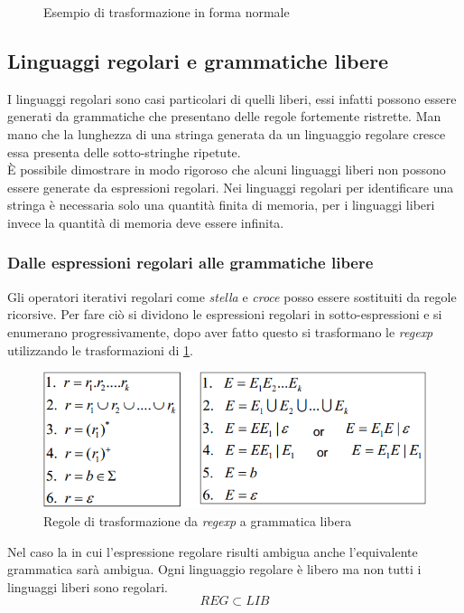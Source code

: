 \begin{figure}
	\centering
	\caption{Esempio di trasformazione in forma normale}
\end{figure}
\subsection{Linguaggi regolari e grammatiche libere}
I linguaggi regolari sono casi particolari di quelli liberi, essi infatti possono essere generati da grammatiche che presentano delle regole fortemente ristrette. Man mano che la lunghezza di una stringa generata da un linguaggio regolare cresce essa presenta delle sotto-stringhe ripetute.\\
È possibile dimostrare in modo rigoroso che alcuni linguaggi liberi non possono essere generate da espressioni regolari.
Nei linguaggi regolari per identificare una stringa è necessaria solo una quantità finita di memoria, per i linguaggi liberi invece la quantità di memoria deve essere infinita.
\subsubsection{Dalle espressioni regolari alle grammatiche libere}
Gli operatori iterativi regolari come \emph{stella} e \emph{croce} posso essere sostituiti da regole ricorsive. Per fare ciò si dividono le espressioni regolari in sotto-espressioni e si enumerano progressivamente, dopo aver fatto questo si trasformano le \emph{regexp} utilizzando le trasformazioni di \figurename \ref{fig:regtogram}.
\begin{figure}
	\centering
	\includegraphics[width=0.5\linewidth]{img/regtogram.png}
	\caption{Regole di trasformazione da \emph{regexp} a grammatica libera}\label{fig:regtogram}
\end{figure}
Nel caso la in cui l'espressione regolare risulti ambigua anche l'equivalente grammatica sarà ambigua. Ogni linguaggio regolare è libero ma non tutti i linguaggi liberi sono regolari.
$$REG \subset LIB$$
